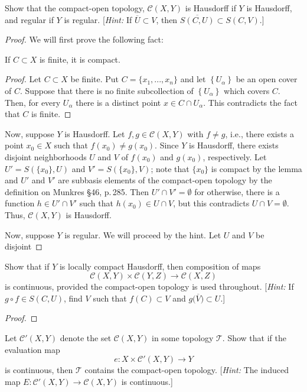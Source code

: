 \begin{problem}[Munkres \S 46, Ex.\,6]
Show that the compact-open topology, $\mathcal{C}(X,Y)$ is
Hausdorff if $Y$ is Hausdorff, and regular if $Y$ is
regular. [\emph{Hint:} If $\overline U\subset V$, then
$\overline{S(C,U)}\subset S(C,V)$.]
\end{problem}
\begin{proof}
We will first prove the following fact:
\begin{lemma*}
If $C\subset X$ is finite, it is compact.
\end{lemma*}
\begin{proof}
\renewcommand\qedsymbol{$\clubsuit$}
Let $C\subset X$ be finite. Put $C=\{x_1,...,x_n\}$ and let
$\left\{U_\alpha\right\}$ be an open cover of $C$. Suppose that there is no
finite subcollection of $\left\{U_\alpha\right\}$ which covers $C$. Then,
for every $U_\alpha$ there is a distinct point $x\in C\cap U_\alpha$. This
contradicts the fact that $C$ is finite.
\end{proof}
Now, suppose $Y$ is Hausdorff. Let $f,g\in\mathcal{C}(X,Y)$ with $f\neq g$,
i.e., there exists a point $x_0\in X$ such that $f(x_0)\neq g(x_0)$. Since
$Y$ is Hausdorff, there exists disjoint neighborhoods $U$ and $V$ of
$f(x_0)$ and $g(x_0)$, respectively. Let $U'=S(\{x_0\},U)$ and
$V'=S(\{x_0\},V)$; note that $\{x_0\}$ is compact by the lemma and $U'$ and
$V'$ are subbasis elements of the compact-open topology by the definition
on Munkres \S 46, p.\,285. Then $U'\cap V'=\emptyset$ for otherwise, there
is a function $h\in U'\cap V'$ such that $h(x_0)\in U\cap V$, but this
contradicts $U\cap V=\emptyset$. Thus, $\mathcal{C}(X,Y)$ is Hausdorff.

Now, suppose $Y$ is regular. We will proceed by the hint. Let $U$ and $V$
be disjoint
\end{proof}
\newpage
\begin{problem}[Munkres \S 46, Ex.\,7]
Show that if $Y$ is locally compact Hausdorff, then composition
of maps
\[\mathcal{C}(X,Y)\times\mathcal{C}(Y,Z)\longrightarrow\mathcal{C}(X,Z)\]
is continuous, provided the compact-open topology is used
throughout. [\emph{Hint:} If $g\circ f\in S(C,U)$, find $V$ such
that $f(C)\subset V$ and $g\bigl(\overline{V}\bigr)\subset U$.]
\end{problem}
\begin{proof}
\end{proof}
\newpage
\begin{problem}[Munkres \S 46, Ex.\,8]
Let $\mathcal{C}'(X,Y)$ denote the set $\mathcal{C}(X,Y)$ in some
topology $\mathcal{T}$. Show that if the evaluation map
\[
e\colon X\times\mathcal{C}'(X,Y)\longrightarrow Y
\]
is continuous, then $\mathcal{T}$ contains the compact-open
topology. [\emph{Hint:} The induced map
$E\colon\mathcal{C}'(X,Y)\to\mathcal{C}(X,Y)$ is continuous.]
\end{problem}
